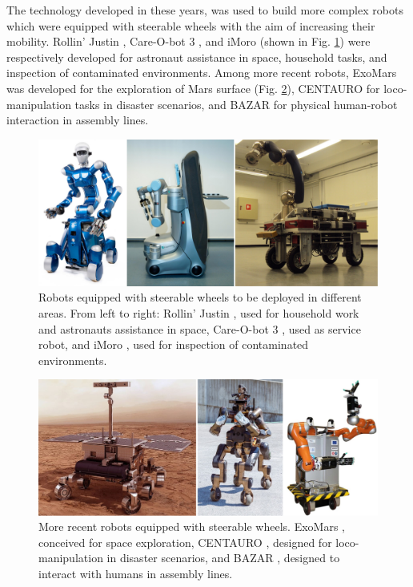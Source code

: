 The technology developed in these years, was used to build more complex robots 
which were equipped with steerable wheels with the aim of increasing their 
mobility. Rollin' Justin \cite{Fuchs2009RollinJustin},
Care-O-bot 3 \cite{Graf2009Care-O-bot3}, and
iMoro \cite{Oftadeh2013iMoro} (shown in Fig. \ref{fig:introduction:SWMRs-1})
were respectively developed for astronaut assistance in space, household tasks,
and inspection of contaminated environments. Among more recent robots,
ExoMars \cite{Poulakis2015ExoMarsMobilitySubsystem} was developed for the 
exploration of Mars surface (Fig. \ref{fig:introduction:SWMRs-2}), CENTAURO \cite{Kashiri2019Centauro} for 
loco-manipulation tasks in disaster scenarios, and BAZAR \cite{Cherubini2019ACR}
for physical human-robot interaction in assembly lines.
\begin{figure}
    \centering
    \includegraphics[width=\textwidth]{figures/01-introduction/SWMRs-1.jpg}
    \caption{Robots equipped with steerable wheels to be deployed in different areas.
        From left to right: Rollin' Justin \cite{Fuchs2009RollinJustin}, used 
        for household work and astronauts assistance in space, 
        Care-O-bot 3 \cite{Graf2009Care-O-bot3}, used as service robot, and
        iMoro \cite{Oftadeh2013iMoro}, used for inspection of contaminated
        environments.}
    \label{fig:introduction:SWMRs-1}
\end{figure}

\begin{figure}
    \centering
    \includegraphics[width=\textwidth]{figures/01-introduction/SWMRs-2.jpg}
    \caption{More recent robots equipped with steerable wheels.
        ExoMars \cite{Poulakis2015ExoMarsMobilitySubsystem}, conceived for 
        space exploration,
        CENTAURO \cite{Kashiri2019Centauro}, designed for loco-manipulation
        in disaster scenarios, and
        BAZAR \cite{Cherubini2019ACR}, designed to interact with humans in
        assembly lines.
    }
    \label{fig:introduction:SWMRs-2}
\end{figure}
